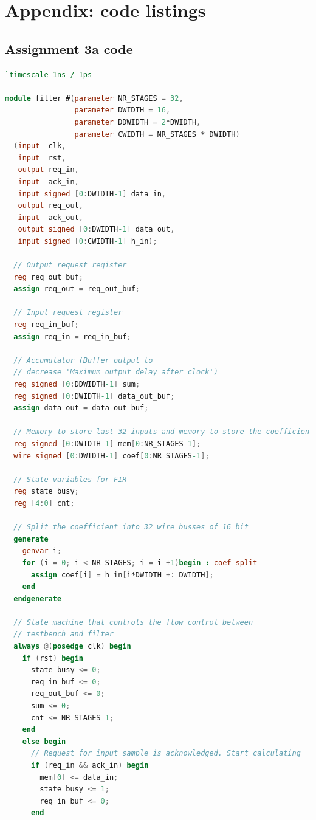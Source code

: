 \documentclass[a4paper,twoside,11pt, fleqn]{article}
\begin{document}
\newpage
\section{Appendix: code listings}

\subsection{Assignment 3a code}
\label{code:3a}

\lstset{ %
	numbers=left
}

\begin{lstlisting}[language=Verilog]
`timescale 1ns / 1ps

module filter #(parameter NR_STAGES = 32,
                parameter DWIDTH = 16,
                parameter DDWIDTH = 2*DWIDTH,
                parameter CWIDTH = NR_STAGES * DWIDTH)
  (input  clk,
   input  rst,
   output req_in,
   input  ack_in,
   input signed [0:DWIDTH-1] data_in,
   output req_out,
   input  ack_out,
   output signed [0:DWIDTH-1] data_out,
   input signed [0:CWIDTH-1] h_in);

  // Output request register
  reg req_out_buf;
  assign req_out = req_out_buf;
  
  // Input request register
  reg req_in_buf;
  assign req_in = req_in_buf;

  // Accumulator (Buffer output to 
  // decrease 'Maximum output delay after clock')
  reg signed [0:DDWIDTH-1] sum;
  reg signed [0:DWIDTH-1] data_out_buf;
  assign data_out = data_out_buf; 

  // Memory to store last 32 inputs and memory to store the coefficients.
  reg signed [0:DWIDTH-1] mem[0:NR_STAGES-1];
  wire signed [0:DWIDTH-1] coef[0:NR_STAGES-1];

  // State variables for FIR
  reg state_busy;
  reg [4:0] cnt;

  // Split the coefficient into 32 wire busses of 16 bit
  generate
    genvar i;
    for (i = 0; i < NR_STAGES; i = i +1)begin : coef_split
      assign coef[i] = h_in[i*DWIDTH +: DWIDTH];
    end
  endgenerate

  // State machine that controls the flow control between
  // testbench and filter
  always @(posedge clk) begin
    if (rst) begin
      state_busy <= 0;
      req_in_buf <= 0;
      req_out_buf <= 0;
      sum <= 0;
      cnt <= NR_STAGES-1;
    end
    else begin
      // Request for input sample is acknowledged. Start calculating
      if (req_in && ack_in) begin
        mem[0] <= data_in;
        state_busy <= 1;
        req_in_buf <= 0;
      end


\end{lstlisting}
\end{document}
